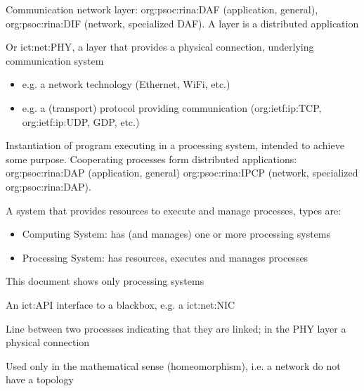 \begin{description}[font=\normalfont,itemsep=0pt]
    \item[\textit{Layer}]
        Communication network layer: \acs{org:psoc:rina:DAF} (application, general), \acs{org:psoc:rina:DIF} (network, specialized DAF).
        A layer is a distributed application

    \item[\acl{ict:net:PHY}]
        Or \acs{ict:net:PHY}, a layer that provides a physical connection, underlying communication system
        \begin{itemize}[noitemsep,topsep=0pt]
            \item e.g. a network technology (Ethernet, WiFi, etc.)
            \item e.g. a (transport) protocol providing communication (\acs{org:ietf:ip:TCP}, \acs{org:ietf:ip:UDP}, GDP, etc.)
        \end{itemize}

    \item[\textit{Process}]
        Instantiation of program executing in a processing system, intended to achieve some purpose.
        Cooperating processes form distributed applications:
            \acs{org:psoc:rina:DAP} (application, general) \acs{org:psoc:rina:IPCP} (network, specialized \acs{org:psoc:rina:DAP}).

    \item[\textit{System}]
        A system that provides resources to execute and manage processes, types are:
        \begin{itemize}[noitemsep,topsep=0pt]
            \item Computing System: has (and manages) one or more processing systems
            \item Processing System: has resources, executes and manages processes
        \end{itemize}
        This document shows only processing systems

    \item[\acl{ict:IF} (\acs{ict:IF})]
        An \acs{ict:API} interface to a blackbox, e.g. a \ac{ict:net:NIC}

    \item[Link, Connection]
        Line between two processes indicating that they are linked; in the PHY layer a physical connection

    \item[Topology]
        Used only in the mathematical sense (homeomorphism), i.e. a network do not have a topology

\end{description}




